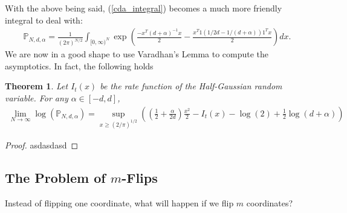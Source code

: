 \documentclass[10pt]{article}
\newcommand{\p}{\mathbb{P}}
\newtheorem{theorem}{\bf Theorem}
\newenvironment{Proof of lemma}{\noindent{\bf Proof of Lemma}}{\hfill$\Box$\newline}
\newenvironment{Proof of claim}{\noindent{\bf Proof of claim}}{\hfill$\Box$\newline}
\newenvironment{Proof of theorem}{\noindent{\bf Proof of Theorem}}{\hfill\scriptsize{$\Box$}\newline}
\newenvironment{Proof of theorems}{\noindent{\bf Proof of Theorems}}{\hfill$\Box$\newline}
\newenvironment{Proof of proposition}{\noindent{\bf Proof of Proposition}}{\hfill$\Box$\newline}
\newenvironment{Proof of propositions}{\noindent{\bf Proof of Propositions}}{\hfill$\Box$\newline}
\newenvironment{Proof of exercise}{\noindent{\it Proof of Exercise:}}{\hfill$\Box$}
\numberwithin{equation}{section}
\begin{document}
With the above being said, (\ref{cda_integral}) becomes a much more friendly integral to deal with:
\begin{align}
    \p_{N,d,\alpha}=\frac{1}{(2\pi)^{N/2}}\int_{[0,\infty)^N} \exp\left(\frac{-x^T(d+\alpha)^{-1}x}{2}-\frac{x^T1(1/2d-1/(d+\alpha))1^Tx}{2} \right) dx.
\end{align}
We are now in a good shape to use Varadhan's Lemma to compute the asymptotics. In fact, the following holds
\begin{theorem}
    Let $I_t(x)$ be the rate function of the Half-Gaussian random variable. For any $\alpha \in [-d,d]$,
    \begin{align}
        \lim_{N \to \infty} \log(\p_{N,d,\alpha}) = \sup_{x \geq (2/\pi)^{1/2}} \left(\left(\frac{1}{2}+\frac{\alpha}{2d}\right)\frac{x^2}{2}-I_t(x) - \log(2) + \frac{1}{2}\log(d+\alpha)\right)
    \end{align}
\end{theorem}
\begin{proof}
    asdasdasd
\end{proof}
\subsection{The Problem of \texorpdfstring{$m$}--Flips}
Instead of flipping one coordinate, what will happen if we flip $m$ coordinates? 
\end{document}
